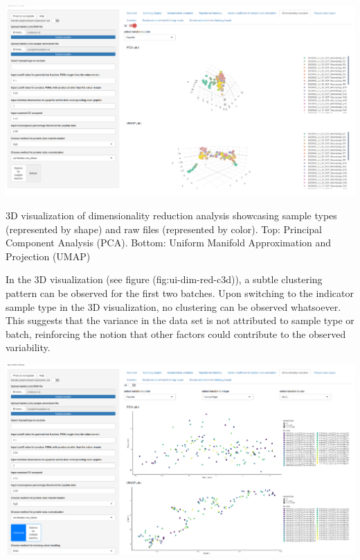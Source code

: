 \documentclass[
  11pt,
]{article}
\let\origfigure\figure
\begin{document}
\newpage
\bgroup  \origfigure[H] 

{\centering \includegraphics[width=1\linewidth]{screenshots/dim_red_3d} 

}

\caption{3D visualization of dimensionality reduction analysis showcasing sample types (represented by shape) and raw files (represented by color). Top: Principal Component Analysis (PCA). Bottom: Uniform Manifold Approximation and Projection (UMAP)}\label{fig:ui-dim-red-c3d}
 \endfigure\egroup

In the 3D visualization (see figure (fig:ui-dim-red-c3d)), a subtle clustering pattern can be observed for the first two batches. Upon switching to the indicator sample type in the 3D visualization, no clustering can be observed whatsoever. This suggests that the variance in the data set is not attributed to sample type or batch, reinforcing the notion that other factors could contribute to the observed variability.

\newpage
\bgroup  \origfigure[H] 

{\centering \includegraphics[width=1\linewidth]{screenshots/dim_red_batchC} 

}
\end{document}
